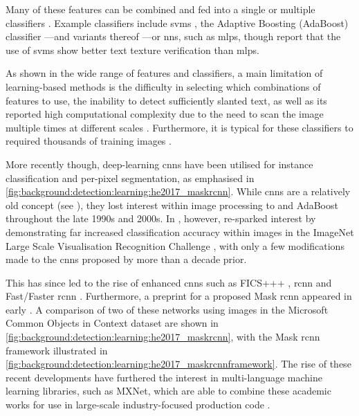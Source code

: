 Many of these features can be combined and fed into a single or multiple classifiers \citep{Pan:2010cj, Hanif:2008un, Hanif:2009tm, Gllavata:2004vq, Ye:2005wu, Wang:2009il, Tu:2003tg}. Example classifiers include \glspl{svm} \citep{Cortes:1995wa,Burges:1998wd,Vapnik:1999vu}, the Adaptive Boosting (AdaBoost) classifier \citep{Freund:1996uc}---and variants thereof \citep{Friedman:2000jg,Hanif:2009tm,Sochman:2005dn}---or \glspl{nn}, such as \glspl{mlp}, though \citet{Chen:2004tja} report that the use of \glspl{svm} show better text texture verification than \glspl{mlp}. 

As shown in the wide range of features and classifiers, a main limitation of learning-based methods is the difficulty in selecting which combinations of features to use, the inability to detect sufficiently slanted text, as well as its reported high computational complexity due to the need to scan the image multiple times at different scales \citep{Li:2012wd, Epshtein:2010tj}. Furthermore, it is typical for these classifiers to required thousands of training images \cite{Chen:2004ux}.

More recently though, deep-learning \glspl{cnn} have been utilised for instance classification and per-pixel segmentation, as emphasised in \cref{fig:background:detection:learning:he2017_maskrcnn}. While \glspl{cnn} are a relatively old concept (see \citet{Lecun:1998hy}), they lost interest within image processing to  and AdaBoost throughout the late 1990s and 2000s. In \citeyear{Krizhevsky:2012wl}, however, \citet{Krizhevsky:2012wl} re-sparked interest by demonstrating far increased classification accuracy within images in the ImageNet Large Scale Visualisation Recognition Challenge \citep{JiaDeng:2009dl}, with only a few modifications made to the \glspl{cnn} proposed by \citeauthor{Lecun:1998hy} more than a decade prior. 

This has since led to the rise of enhanced \glspl{cnn} such as FICS+++ \citep{Li:2016uj}, \gls{rcnn} \citep{Girshick:2014jx} and Fast/Faster \gls{rcnn} \citep{Girshick:2015vr, Ren:2017ug}. Furthermore, a preprint for a proposed Mask \gls{rcnn} \citep{He:2017ud} appeared in early \citeyear{He:2017ud}. A comparison of two of these networks using images in the Microsoft Common Objects in Context \cite{Lin:2014vma} dataset are shown in \cref{fig:background:detection:learning:he2017_maskrcnn}, with the Mask \gls{rcnn} framework illustrated in \cref{fig:background:detection:learning:he2017_maskrcnnframework}. The rise of these recent developments have furthered the interest in multi-language machine learning libraries, such as MXNet, which are able to combine these academic works for use in large-scale industry-focused production code \cite{Chen:2015vh}.

